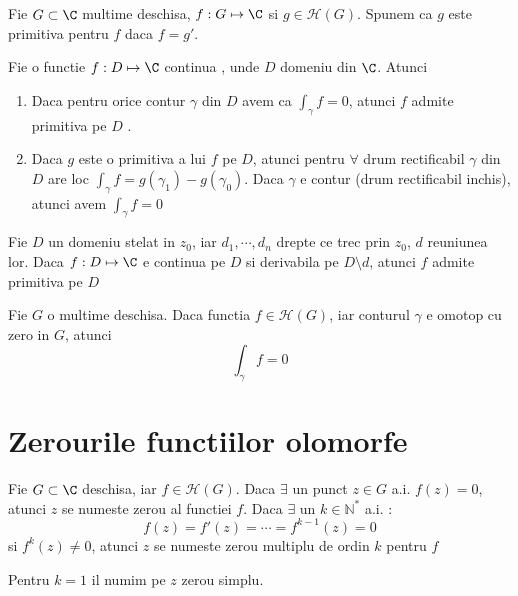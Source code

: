 \begin{definition}
    Fie $G\subset \C$ multime deschisa, $f:G\mapsto \C$ si $g \in \mathcal{H}(G)$. Spunem ca $g$
    este primitiva pentru $f$ daca $f = g'$.
\end{definition}

\begin{theorem}
    Fie o functie $f:D\mapsto \C$ continua , unde $D$ domeniu din $\C$. Atunci
    \begin{enumerate}
        \item Daca pentru orice contur $\gamma$ din $D$ avem ca $\displaystyle \int_{\gamma} f = 0$, atunci $f$
            admite primitiva pe $D$ .
        \item Daca $g$ este o primitiva a lui $f$ pe $D$, atunci pentru $\forall$ drum rectificabil
            $\gamma$ din $D$ are loc $\displaystyle \int_{\gamma} f = g(\gamma_1) - g(\gamma_0)$. Daca $\gamma$
            e contur (drum rectificabil inchis), atunci avem $\displaystyle \int_{\gamma} f = 0$
    \end{enumerate}
\end{theorem}

\begin{theorem}
    Fie $D$ un domeniu stelat in $z_0$, iar $d_1, \cdots , d_n$ drepte ce trec prin $z_0$,
    $d$ reuniunea lor. Daca $f:D\mapsto \C$ e continua pe $D$ si derivabila pe $D\setminus d$,
    atunci $f$ admite primitiva pe $D$
\end{theorem}

\begin{theorem}[Cauchy]
    Fie $G$ o multime deschisa. Daca functia $f\in\mathcal{H}(G)$, iar conturul $\gamma$ e omotop cu zero
     in $G$, atunci
     \[
        \int_{\gamma} f = 0
     \]
\end{theorem}


\section{Zerourile functiilor olomorfe}

\begin{definition}
    Fie $G\subset \C$ deschisa, iar $f \in \mathcal{H}(G)$. Daca $\exists$ un punct $z\in G$ a.i.
    $f(z) = 0$, atunci $z$ se numeste zerou al functiei $f$. Daca $\exists$ un $k\in\mathbb{N}^{*}$
    a.i. :
    \[
        f(z) = f'(z) = \cdots = f^{k-1}(z) = 0
    \]
    si $f^{k}(z) \neq 0$, atunci $z$ se numeste zerou multiplu de ordin $k$ pentru $f$

    Pentru $k=1$ il numim pe $z$ zerou simplu.
\end{definition}

